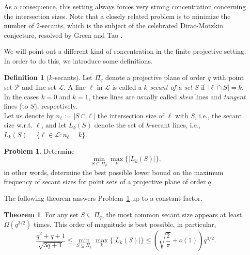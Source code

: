 \documentclass[10pt]{article}
\newcommand{\cP}{\mathcal{P}}
\newcommand{\cL}{\mathcal{L}}
\theoremstyle{definition}
\newtheorem{theorem}[thm]{Theorem}
\newtheorem{problem}[thm]{Problem}
\newtheorem{defi}[thm]{Definition}
\newcommand{\zsst}[1]{%
	\bgroup
	\markoverwith{\textcolor{magenta}{\rule[0.5ex]{2pt}{1.2pt}}}%
	\ULon{#1}%
	\egroup
}
\begin{document}
	
	
	
	As a consequence, this setting always forces very strong concentration concerning the intersection sizes. 
	Note that a closely related problem is to {minimize} the number of $2$-secants, which is the subject of the  celebrated Dirac-Motzkin conjecture, resolved by Green and Tao \cite{Green-Tao}.
	
	We will point out a different kind of concentration in the finite projective setting. In order to do this, we introduce some definitions.
	
	
	
	\begin{defi}[$k$-secants] Let $\Pi_q$ denote a projective plane of order $q$ with point set $\cP$ and line set $\cL$.
		A line $\ell$ in $\cL$ is called a\textit{ $k$-secant of a set} $S$ if $|\ell\cap S|=k$. In the cases $k=0$ and $k=1$, these lines are usually called \textit{skew} lines and\textit{ tangent }lines (to $S$), respectively.\\  Let us denote by $n_{\ell}:=|S\cap \ell|$ the intersection size of $\ell$ with $S$, i.e., the secant size w.r.t. $\ell$,  and let $L_k(S)$ denote the set of $k$-secant lines, i.e., $L_k(S)=\{\ell\in \cL: n_{\ell}=k\}$.
	\end{defi}
	
	
	
	
	\begin{problem}\label{prob:main}
		Determine $$\min_{ S\subseteq \Pi_q} \max_k \{|L_k(S)|\},$$ in other words, determine the best possible lower bound on the {maximum frequency of secant sizes} for point sets of a  projective plane of order $q$.
	\end{problem}
	
	{The following theorem answers Problem~\ref{prob:main} up to a constant
		factor.}
	
	\begin{theorem}\label{leggyakoribb}
		{For any set $S \subseteq \Pi_q$, the most common secant size appears at least $\Omega(q^{3/2})$ times.} This order of magnitude is best possible, in particular,
		$$%
		{\ensuremath{\frac{q^2+q+1}{\sqrt{3q+1}}}}\le \min_{ S\subseteq \Pi_q} \max_k \{|L_k(S)|\}\le  %
		{\ensuremath{\left(\sqrt{\frac{2}{\pi}}+o(1)\right)q^{3/2}}}.$$
	\end{theorem}
	
\end{document}

